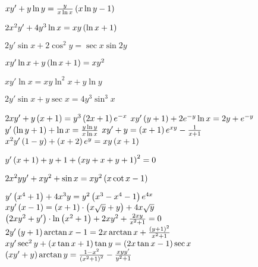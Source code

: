 \begin{multicols}{2}
\begin{enumtasks}
			\item \( x y' + y \ln{y} = \frac{y}{x\ln{x}} \left( x\ln{y} - 1 \right) \)											%
			\item \( 2x^2 y' + 4y^3 \ln{x} = xy \left( \ln{x} + 1 \right) \)													%
			\item \( 2y' \sin{x} + 2 \cos^2{y} = \sec{x} \sin{2y} \)													%
			\item \( xy' \ln{x} + y \left( \ln{x} + 1 \right) = xy^2 \)														%
			\item \( xy' \ln{x} = xy \ln^2{x} + y\ln{y} \)																%
			\item \( 2y' \sin{x} + y \sec{x} = 4y^3 \sin^3{x} \)														%
			\item \( 2xy' + y \left( x + 1 \right) = y^3 \left( 2x + 1 \right) e^{-x} \)												%
			\itemstar \( x y' \left( y + 1 \right) + 2 e^{-y} \ln{x} = 2y + e^{-y} \)											%
			\itemstar \( y' \left( \ln{y} + 1 \right) + \ln{x} = \frac{y \ln{y}}{x \ln{x}} \)									%
			\itemstar \( x y' + y = \left( x + 1 \right)e^{x y} - \frac{1}{x + 1} \)											%
			\itemstar \( x^2 y' \left( 1 - y \right) + \left( x + 2 \right) e^{y} = xy \left( x + 1 \right) \)								%
			
		\end{enumtasks}
	\end{multicols}

	\begin{enumtasks}

		\label{firstorder:to_linear2}
		\item \( y' \left( x + 1 \right) + y + 1 + \left( xy + x + y + 1 \right)^2 = 0 \)												%
		\item \( 2x^2 yy' + xy^2 + \sin{x} = x y^2 \left( x \cot{x} - 1 \right) \)												%
		\item \( y' \left( x^4 + 1 \right) + 4x^3 y = y^2 \left( x^3 - x^4 - 1 \right) e^{4x} \)										%
		\itemstar \( xy' \left( x - 1 \right) = \left( x + 1 \right) \cdot \left( x \sqrt{y} + y \right) + 4x \sqrt{y} \)					%
		\itemstar \( \left( 2 xy^2 + y' \right) \cdot \ln{ \left( x^2 + 1 \right) } + 2xy^2 + \frac{2xy}{x^2 + 1} = 0 \)				%
		\itemstar \( 2y' \left( y + 1 \right) \arctan{x} - 1 = 2x \arctan{x} + \frac{\left( y + 1 \right)^2}{x^2 + 1} \)				%
		\itemstar \( xy' \sec^2{y} + \left( x \tan{x} + 1 \right) \tan{y} = \left( 2 x \tan{x} - 1 \right) \sec{x} \)					%
		\itemstar \( \left( xy' + y \right) \arctan{y} = \frac{1 - x^2}{\left( x^2 + 1 \right)^2} - \frac{xyy'}{y^2 + 1} \)			%

	\end{enumtasks}

